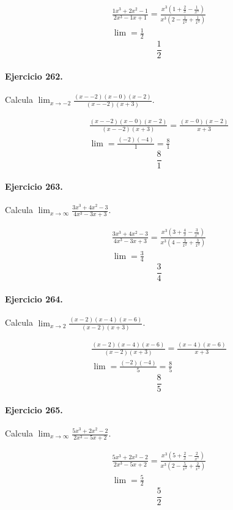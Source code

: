 \documentclass[11pt,a4paper]{article}
\begin{document}
\[
\begin{aligned}
\frac{1x^3+2x^2-1}{2x^3-1x+1}=\frac{x^3(1+\frac{2}{x}-\frac{1}{x^3})}{x^3(2-\frac{1}{x^2}+\frac{1}{x^3})}\\
\lim=\frac{1}{2}
\end{aligned}
\]
\[\boxed{\frac{1}{2}}\]


\paragraph{Ejercicio 262.} Calcula $\displaystyle\lim_{x\to -2}\frac{(x--2)(x-0)(x-2)}{(x--2)(x+3)}$. 

\[
\begin{aligned}
\frac{(x--2)(x-0)(x-2)}{(x--2)(x+3)}=\frac{(x-0)(x-2)}{x+3}\\
\lim=\frac{(-2)(-4)}{1}=\frac{8}{1}
\end{aligned}
\]
\[\boxed{\frac{8}{1}}\]


\paragraph{Ejercicio 263.} Calcula $\displaystyle\lim_{x\to\infty}\frac{3x^3+4x^2-3}{4x^3-3x+3}$. 

\[
\begin{aligned}
\frac{3x^3+4x^2-3}{4x^3-3x+3}=\frac{x^3(3+\frac{4}{x}-\frac{3}{x^3})}{x^3(4-\frac{3}{x^2}+\frac{3}{x^3})}\\
\lim=\frac{3}{4}
\end{aligned}
\]
\[\boxed{\frac{3}{4}}\]


\paragraph{Ejercicio 264.} Calcula $\displaystyle\lim_{x\to 2}\frac{(x-2)(x-4)(x-6)}{(x-2)(x+3)}$. 

\[
\begin{aligned}
\frac{(x-2)(x-4)(x-6)}{(x-2)(x+3)}=\frac{(x-4)(x-6)}{x+3}\\
\lim=\frac{(-2)(-4)}{5}=\frac{8}{5}
\end{aligned}
\]
\[\boxed{\frac{8}{5}}\]


\paragraph{Ejercicio 265.} Calcula $\displaystyle\lim_{x\to\infty}\frac{5x^3+2x^2-2}{2x^3-5x+2}$. 

\[
\begin{aligned}
\frac{5x^3+2x^2-2}{2x^3-5x+2}=\frac{x^3(5+\frac{2}{x}-\frac{2}{x^3})}{x^3(2-\frac{5}{x^2}+\frac{2}{x^3})}\\
\lim=\frac{5}{2}
\end{aligned}
\]
\[\boxed{\frac{5}{2}}\]
\end{document}
